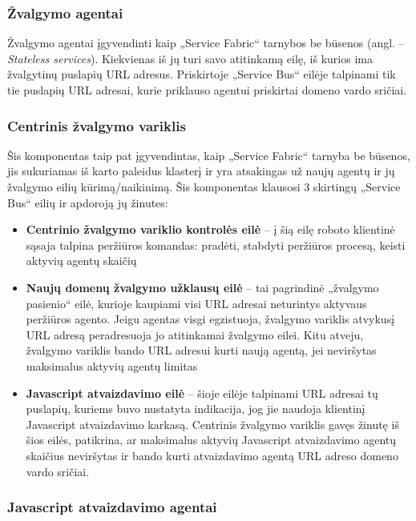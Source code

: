 

\subsubsection{Žvalgymo agentai}

Žvalgymo agentai įgyvendinti kaip „Service Fabric“ tarnybos be būsenos (angl. -- \textit{Stateless services}). Kiekvienas iš jų turi savo atitinkamą eilę, iš kurios ima žvalgytinų puslapių URL adresus. Priskirtoje „Service Bus“ eilėje talpinami tik tie puslapių URL adresai, kurie priklauso agentui priskirtai domeno vardo sričiai.

\subsubsection{Centrinis žvalgymo variklis}

Šis komponentas taip pat įgyvendintas, kaip „Service Fabric“ tarnyba be būsenos, jis sukuriamas iš karto paleidus klasterį ir yra atsakingas už naujų agentų ir jų žvalgymo eilių kūrimą/naikinimą. Šis komponentas klausosi 3 skirtingų „Service Bus“ eilių ir apdoroją jų žinutes:

\begin{itemize}
    \item \textbf{Centrinio žvalgymo variklio kontrolės eilė} -- į šią eilę roboto klientinė sąsaja talpina peržiūros komandas: pradėti, stabdyti peržiūros procesą, keisti aktyvių agentų skaičių
    \item \textbf{Naujų domenų žvalgymo užklausų eilė} -- tai pagrindinė „žvalgymo pasienio“ eilė, kurioje kaupiami visi URL adresai neturintys aktyvaus peržiūros agento. Jeigu agentas visgi egzistuoja, žvalgymo variklis atvykusį URL adresą peradresuoja jo atitinkamai žvalgymo eilei. Kitu atveju, žvalgymo variklis bando URL adresui kurti naują agentą, jei neviršytas maksimalus aktyvių agentų limitas
    \item \textbf{Javascript atvaizdavimo eilė} -- šioje eilėje talpinami URL adresai tų puslapių, kuriems buvo nustatyta indikacija, jog jie naudoja klientinį Javascript atvaizdavimo karkasą. Centrinis žvalgymo variklis gavęs žinutę iš šios eilės, patikrina, ar maksimalus aktyvių Javascript atvaizdavimo agentų skaičius neviršytas ir bando kurti atvaizdavimo agentą URL adreso domeno vardo sričiai.
\end{itemize}

\subsubsection{Javascript atvaizdavimo agentai}

